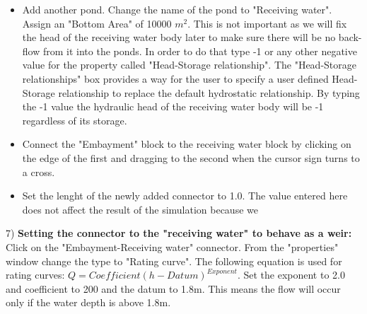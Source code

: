 \begin{itemize}
\item Add another pond. Change the name of the pond to "Receiving water". Assign an "Bottom Area" of 10000 $m^2$. This is not important as we will fix the head of the receiving water body later to make sure there will be no back-flow from it into the ponds. In order to do that type -1 or any other negative value for the property called "Head-Storage relationship". The "Head-Storage relationships" box provides a way for the user to specify a user defined Head-Storage relationship to replace the default hydrostatic relationship. By typing the -1 value the hydraulic head of the receiving water body will be -1 regardless of its storage. 
\item Connect the "Embayment" block to the receiving water block by clicking on the edge of the first and dragging to the second when the cursor sign turns to a cross. 
\item Set the lenght of the newly added connector to 1.0. The value entered here does not affect the result of the simulation because we 
\end{itemize}

7) \textbf{Setting the connector to the "receiving water" to behave as a weir: }
Click on the "Embayment-Receiving water" connector. From the "properties" window change the type to "Rating curve". The following equation is used for rating curves: $Q=Coefficient(h-Datum)^{Exponent}$. Set the exponent to 2.0 and coefficient to 200 and the datum to 1.8m. This means the flow will occur only if the water depth is above 1.8m. 

